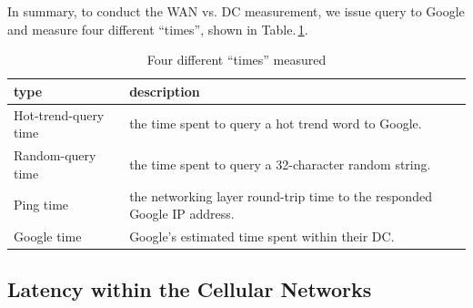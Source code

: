 In summary, to conduct the WAN vs. DC measurement, we issue query to Google and measure four different ``times'', shown in Table.\,\ref{tab:DC_method}.

\begin{table}
  \begin{tabular}{p{2.8cm} | p{5cm}}
    \hline
    type & description \\
    \hline
    Hot-trend-query time & the time spent to query a hot trend word to Google. \\
    Random-query time & the time spent to query a 32-character random string.  \\
    Ping time & the networking layer round-trip time to the responded Google IP address. \\
    Google time & Google's estimated time spent within their DC. \\
    \hline
  \end{tabular}
  \caption{Four different ``times'' measured}
  \label{tab:DC_method}
\end{table}


\subsection{Latency within the Cellular Networks}
\label{sec:latency-with-celull}



